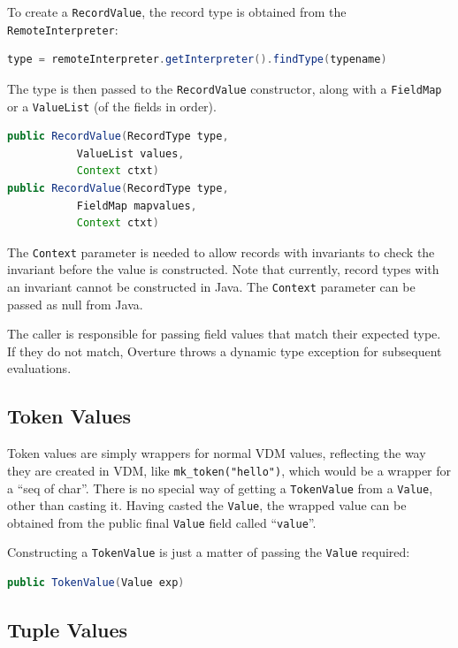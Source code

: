\documentclass{overturerepchap}
\begin{document}
To create a \texttt{RecordValue}, the record type is obtained from the \texttt{RemoteInterpreter}:

\begin{lstlisting}[language=JAVA]
type = remoteInterpreter.getInterpreter().findType(typename)
\end{lstlisting}

The type is then passed to the \texttt{RecordValue} constructor, along with a \texttt{FieldMap} or a \texttt{ValueList} (of the fields in order).

\begin{lstlisting}[language=JAVA]
public RecordValue(RecordType type,
		   ValueList values, 
		   Context ctxt)
public RecordValue(RecordType type, 
		   FieldMap mapvalues, 
		   Context ctxt)
\end{lstlisting}

The \texttt{Context} parameter is needed to allow records with invariants to check the invariant before the value is constructed. Note that currently, record types with an invariant cannot be constructed in Java. The \texttt{Context} parameter can be passed as null from Java.

The caller is responsible for passing field values that match their expected type. If they do not match, Overture throws a dynamic type exception for subsequent evaluations.

\subsection{Token Values}

Token values are simply wrappers for normal VDM values, reflecting the way they are created in VDM, like \texttt{mk\_token("hello")}, which would be a wrapper for a ``{\textbf\ttfamily seq of char}''. There is no special way of getting a \texttt{TokenValue} from a \texttt{Value}, other than casting it. Having casted the \texttt{Value}, the wrapped value can be obtained from the public final \texttt{Value} field called ``\texttt{value}''.

Constructing a \texttt{TokenValue} is just a matter of passing the \texttt{Value} required:

\begin{lstlisting}[language=JAVA]
public TokenValue(Value exp)
\end{lstlisting}

\subsection{Tuple Values}
\end{document}
